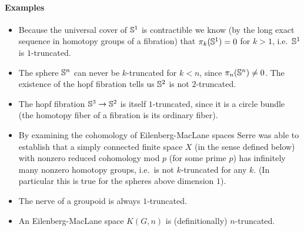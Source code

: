 \paragraph{Examples}

\begin{itemize}
\tightlist
\item
  Because the universal cover of \(\S^1\) is contractible we know (by the long exact sequence in homotopy groups of a fibration) that \(\pi_k(\S^1) = 0\) for \(k > 1\), i.e.~\(\S^1\) is \(1\)-truncated.
\item
  The sphere \(\S^n\) can never be \(k\)-truncated for \(k < n\), since \(\pi_n(\S^n) \neq 0\). The existence of the hopf fibration tells us \(\S^2\) is not \(2\)-truncated.
\item
  The hopf fibration \(\S^3 \to \S^2\) is itself \(1\)-truncated, since it is a circle bundle (the homotopy fiber of a fibration is its ordinary fiber).
\item
  By examining the cohomology of Eilenberg-MacLane spaces Serre was able to establish that a simply connected finite space \(X\) (in the sense defined below) with nonzero reduced cohomology mod \(p\) (for some prime \(p\)) has infinitely many nonzero homotopy groups, i.e.~is not \(k\)-truncated for any \(k\). (In particular this is true for the spheres above dimension \(1\)).
\item
  The nerve of a groupoid is always \(1\)-truncated.
\item
  An Eilenberg-MacLane space \(K(G, n)\) is (definitionally) \(n\)-truncated.
\end{itemize}

